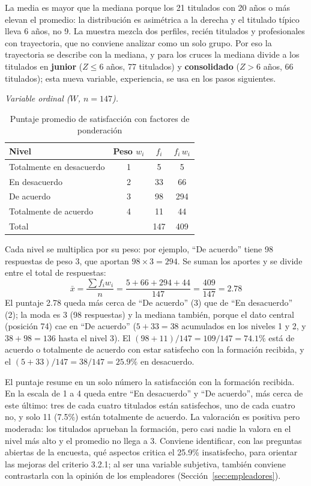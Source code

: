 \documentclass[12pt, a4paper]{article}
\newenvironment{mitabla}[2][H]{%
  \begin{table}[#1]
  \centering
  \caption{#2}
  \small
}{%
  \end{table}
}
\begin{document}
La media es mayor que la mediana porque los 21 titulados con 20 años o
más elevan el promedio: la distribución es asimétrica a la derecha y el
titulado típico lleva 6 años, no 9. La muestra mezcla dos perfiles,
recién titulados y profesionales con trayectoria, que no conviene
analizar como un solo grupo. Por eso la trayectoria se describe con la
mediana, y para los cruces la mediana divide a los titulados en
\textbf{junior} ($Z \le 6$ años, 77 titulados) y \textbf{consolidado}
($Z > 6$ años, 66 titulados); esta nueva variable, experiencia, se usa en
los pasos siguientes.

\textit{Variable ordinal ($W$, $n = 147$).}

\begin{mitabla}{Puntaje promedio de satisfacción con factores de ponderación}\label{tab:real-ponderacion}
\begin{tabular}{lccc}
\toprule
\textbf{Nivel} & \textbf{Peso $w_i$} & \textbf{$f_i$} & \textbf{$f_i \, w_i$} \\
\midrule
Totalmente en desacuerdo & 1 & 5   & 5 \\
En desacuerdo            & 2 & 33  & 66 \\
De acuerdo               & 3 & 98  & 294 \\
Totalmente de acuerdo    & 4 & 11  & 44 \\
\midrule
Total & & 147 & 409 \\
\bottomrule
\end{tabular}
\end{mitabla}

Cada nivel se multiplica por su peso: por ejemplo, ``De acuerdo'' tiene
98 respuestas de peso 3, que aportan $98 \times 3 = 294$. Se suman los
aportes y se divide entre el total de respuestas:
\[
\bar{x} = \frac{\sum f_i w_i}{n} = \frac{5 + 66 + 294 + 44}{147} =
\frac{409}{147} = 2.78
\]
El puntaje 2.78 queda más cerca de ``De acuerdo'' (3) que de ``En
desacuerdo'' (2); la moda es 3 (98 respuestas) y la mediana también, porque el
dato central (posición 74) cae en ``De acuerdo'' ($5 + 33 = 38$
acumulados en los niveles 1 y 2, y $38 + 98 = 136$ hasta el nivel 3). El
$(98+11)/147 = 109/147 = 74.1\%$ está de acuerdo o totalmente de acuerdo
con estar satisfecho con la formación recibida, y el $(5+33)/147 =
38/147 = 25.9\%$ en desacuerdo.

El puntaje resume en un solo número la satisfacción con la formación
recibida. En la escala de 1 a 4 queda entre ``En desacuerdo'' y ``De
acuerdo'', más cerca de este último: tres de cada cuatro titulados están
satisfechos, uno de cada cuatro no, y solo 11 (7.5\%) están totalmente de
acuerdo. La valoración es positiva pero moderada: los titulados aprueban
la formación, pero casi nadie la valora en el nivel más alto y el
promedio no llega a 3. Conviene identificar, con las preguntas abiertas
de la encuesta, qué aspectos critica el 25.9\% insatisfecho, para
orientar las mejoras del criterio 3.2.1; al ser una variable subjetiva,
también conviene contrastarla con la opinión de los empleadores
(Sección~\ref{sec:empleadores}).
\end{document}
